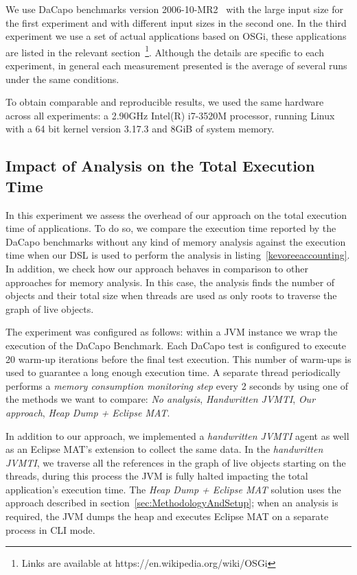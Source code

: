 We use DaCapo benchmarks version 2006-10-MR2~\cite{DaCapo:paper} with the large input size for the first experiment and with different input sizes in the second one.
In the third experiment we use a set of actual applications based on OSGi, these applications are listed in the relevant section~\footnote{Links are available at https://en.wikipedia.org/wiki/OSGi}.
Although the details are specific to each experiment, in general each measurement presented is the average of several runs under the same conditions.

To obtain comparable and reproducible results, we used the same hardware across all experiments: a 2.90GHz Intel(R) i7-3520M processor, running Linux with a 64 bit kernel version 3.17.3 and 8GiB of system memory.

\subsection{Impact of Analysis on the Total Execution Time}

In this experiment we assess the overhead of our approach on the total execution time of applications.
To do so, we compare the execution time reported by the DaCapo benchmarks without any kind of memory analysis against the execution time when our DSL is used to perform the analysis in listing~\ref{kevoreeaccounting}.
In addition, we check how our approach behaves in comparison to other approaches for memory analysis.
In this case, the analysis finds the number of objects and their total size when threads are used as only roots to traverse the graph of live objects.

The experiment was configured as follows: within a JVM instance we wrap the execution of the DaCapo Benchmark.
Each DaCapo test is configured to execute 20 warm-up iterations before the final test execution.
This number of warm-ups is used to guarantee a long enough execution time.
A separate thread periodically performs a \textit{memory consumption monitoring step} every 2 seconds by using one of the methods we want to compare: \textit{No analysis}, \textit{Handwritten JVMTI}, \textit{Our approach}, \textit{Heap Dump + Eclipse MAT}.

In addition to our approach, we implemented a \textit{handwritten JVMTI} agent as well as an Eclipse MAT's  extension to collect the same data.
In the \textit{handwritten JVMTI}, we traverse all the references in the graph of live objects starting on the threads, during this process the JVM is fully halted impacting the total application's execution time.
The \textit{Heap Dump + Eclipse MAT} solution uses the approach described in section~\ref{sec:MethodologyAndSetup}; when an analysis is required, the JVM dumps the heap and executes Eclipse MAT on a separate process in CLI mode.


